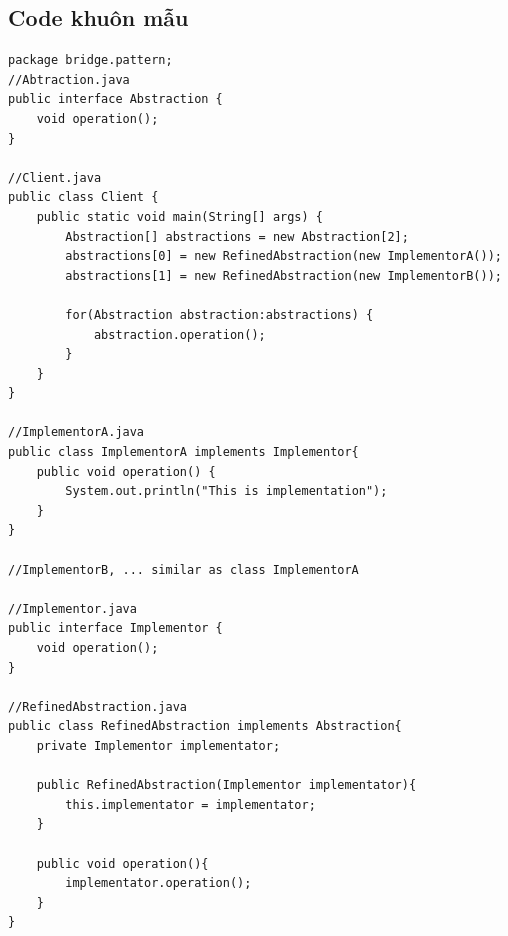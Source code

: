 \documentclass{article}
\begin{document}
    \subsection{Code khuôn mẫu}
    \begin{lstlisting}
package bridge.pattern;
//Abtraction.java
public interface Abstraction {
	void operation();
}

//Client.java
public class Client {
	public static void main(String[] args) {
        Abstraction[] abstractions = new Abstraction[2];
        abstractions[0] = new RefinedAbstraction(new ImplementorA());
        abstractions[1] = new RefinedAbstraction(new ImplementorB());
        
        for(Abstraction abstraction:abstractions) {
            abstraction.operation();
        }
    }
}

//ImplementorA.java
public class ImplementorA implements Implementor{
	public void operation() {
        System.out.println("This is implementation");
    }
}

//ImplementorB, ... similar as class ImplementorA

//Implementor.java
public interface Implementor {
	void operation();
}

//RefinedAbstraction.java
public class RefinedAbstraction implements Abstraction{
    private Implementor implementator;
    
    public RefinedAbstraction(Implementor implementator){
        this.implementator = implementator;
    }
    
    public void operation(){
        implementator.operation();
    }
}
    \end{lstlisting}
\end{document}
